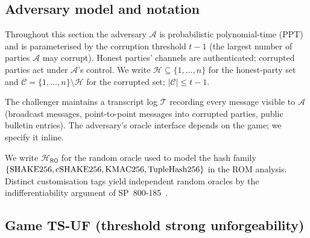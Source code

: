 %

\subsection{Adversary model and notation}
\label{sec:sec-notation}

Throughout this section the adversary $\mathcal{A}$ is probabilistic
polynomial-time (PPT) and is parameterised by the corruption
threshold $t-1$ (the largest number of parties $\mathcal{A}$ may
corrupt). Honest parties' channels are authenticated; corrupted
parties act under $\mathcal{A}$'s control. We write $\mathcal{H}
\subseteq \{1, \dots, n\}$ for the honest-party set and
$\mathcal{C} = \{1, \dots, n\} \setminus \mathcal{H}$ for the corrupted
set; $|\mathcal{C}| \le t-1$.

The challenger maintains a transcript log
$\mathcal{T}$ recording every message visible to $\mathcal{A}$
(broadcast messages, point-to-point messages into corrupted parties,
public bulletin entries). The adversary's oracle interface depends on
the game; we specify it inline.

We write $\mathcal{H}_{\mathsf{RO}}$ for the random oracle used to model the
hash family $\{\mathrm{SHAKE256}, \mathrm{cSHAKE256}, \mathrm{KMAC256}, \mathrm{TupleHash256}\}$ in the ROM
analysis. Distinct customisation tags yield independent random
oracles by the indifferentiability argument of
SP~800-185~\cite{nist-sp800-185}.

\subsection{Game TS-UF (threshold strong unforgeability)}
\label{sec:game-tsuf}

